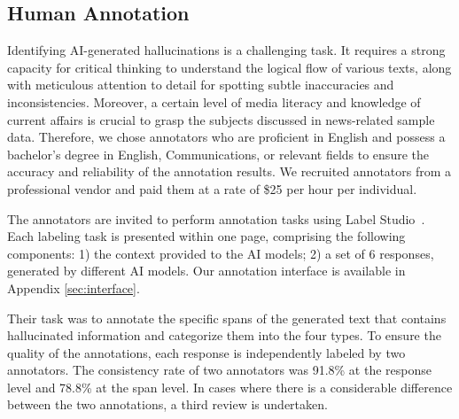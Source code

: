 \documentclass[11pt]{article}
\begin{document}

\subsection{Human Annotation}

Identifying AI-generated hallucinations is a challenging task. It requires a strong capacity for critical thinking to understand the logical flow of various texts, along with meticulous attention to detail for spotting subtle inaccuracies and inconsistencies. 
Moreover, a certain level of media literacy and knowledge of current affairs is crucial to grasp the subjects discussed in news-related sample data. 
Therefore, we chose annotators who are proficient in English and possess a bachelor's degree in English, Communications, or relevant fields to ensure the accuracy and reliability of the annotation results. We recruited annotators from a professional vendor and paid them at a rate of \$25 per hour per individual.

The annotators are invited to perform annotation tasks using Label Studio~\cite{labelstudio2023}. Each labeling task is presented within one page, comprising the following components: 1) the context provided to the AI models; 2) a set of 6 responses, generated by different AI models. Our annotation interface is available in Appendix \ref{sec:interface}.

Their task was to annotate the specific spans of the generated text that contains hallucinated information and categorize them into the four types.
To ensure the quality of the annotations, each response is independently labeled by two annotators. 
The consistency rate of two annotators was 91.8\% at the response level and 78.8\% at the span level.
In cases where there is a considerable difference between the two annotations, a third review is undertaken. 
\end{document}
